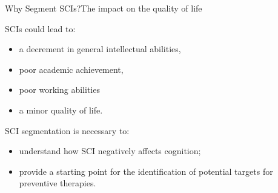 \documentclass[]{standalone}
\begin{document}
	\begin{frame}{Why Segment SCIs?}{The impact on the quality of life}
	\normalsize
	\vspace{-25pt}
		\begin{exampleblock}{SCIs could lead to:}
			 \begin{itemize}
			 	\item a decrement in general intellectual abilities, 
			 	\item poor academic achievement, 
			 	\item poor working abilities
			 	\item a minor quality of life.
			 \end{itemize}
		\end{exampleblock}
		\vspace{10pt}
		\begin{block}{SCI segmentation is necessary to:}
			\begin{itemize}
				\item understand how SCI negatively affects cognition;
				\item provide a starting point for the identification of potential targets for preventive therapies.
			\end{itemize}
		\end{block}

	\end{frame}
\end{document}
